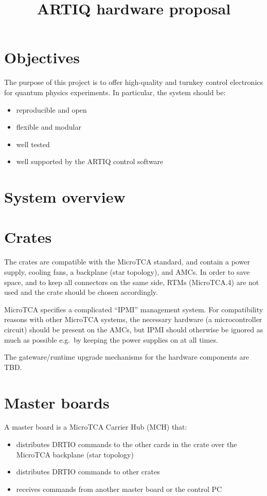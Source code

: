 \documentclass[11pt]{paper}
\begin{document}
\title{ARTIQ hardware proposal}

\maketitle

\section{Objectives}
The purpose of this project is to offer high-quality and turnkey control electronics for quantum physics experiments. In particular, the system should be:
\begin{itemize}
\setlength{\itemsep}{0pt}
\item reproducible and open
\item flexible and modular
\item well tested
\item well supported by the ARTIQ control software
\end{itemize}

\section{System overview}

\section{Crates}
The crates are compatible with the MicroTCA standard, and contain a power supply, cooling fans, a backplane (star topology), and AMCs. In order to save space, and to keep all connectors on the same side, RTMs (MicroTCA.4) are not used and the crate should be chosen accordingly.

MicroTCA specifies a complicated ``IPMI'' management system. For compatibility reasons with other MicroTCA systems, the necessary hardware (a microcontroller circuit) should be present on the AMCs, but IPMI should otherwise be ignored as much as possible e.g.\ by keeping the power supplies on at all times.

The gateware/runtime upgrade mechanisms for the hardware components are TBD.

\section{Master boards}
A master board is a MicroTCA Carrier Hub (MCH) that:
\begin{itemize}
\setlength{\itemsep}{0pt}
\item distributes DRTIO commands to the other cards in the crate over the MicroTCA backplane (star topology)
\item distributes DRTIO commands to other crates
\item receives commands from another master board or the control PC
\end{itemize}
\end{document}
